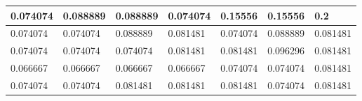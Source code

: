 \begin{tabular}{|l|l|l|l|l|l|l|}
\hline
0.074074&0.088889&0.088889&0.074074&0.15556&0.15556&0.2\\\hline
0.074074&0.074074&0.088889&0.081481&0.074074&0.088889&0.081481\\\hline
0.074074&0.074074&0.074074&0.081481&0.081481&0.096296&0.081481\\\hline
0.066667&0.066667&0.066667&0.066667&0.074074&0.074074&0.081481\\\hline
0.074074&0.074074&0.081481&0.081481&0.081481&0.074074&0.081481\\\hline
\end{tabular}
